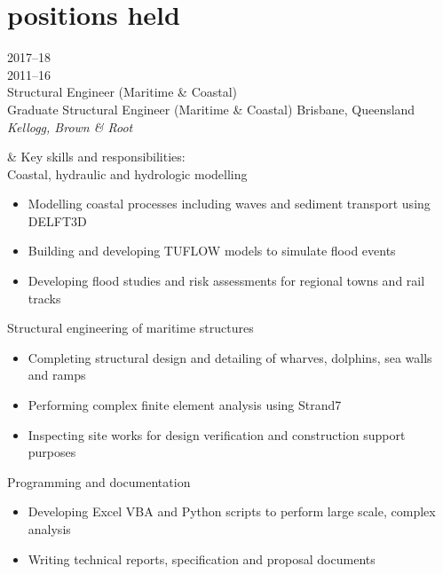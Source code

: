 
\section{positions held}

\begin{entrylist}

\entry%
{2017--18\\
2011--16}
{\vspace*{-4.6ex}\\Structural Engineer (Maritime \& Coastal)\\
Graduate Structural Engineer (Maritime \& Coastal)}%
{Brisbane, Queensland}
{\emph{Kellogg, Brown \& Root}}

& Key skills and responsibilities:\\

\entrybulletsindented%
{}
{Coastal, hydraulic and hydrologic modelling}
{}
{\begin{itemize}
\item Modelling coastal processes including waves and sediment transport using DELFT3D
\item Building and developing TUFLOW models to simulate flood events
\item Developing flood studies and risk assessments for regional towns and rail tracks
\end{itemize}
}

\entrybulletsindented%
{}
{Structural engineering of maritime structures}
{}
{\begin{itemize}
  \item Completing structural design and detailing of wharves, dolphins, sea walls and ramps
  \item Performing complex finite element analysis using Strand7
  \item Inspecting site works for design verification and construction support purposes
\end{itemize}
}

\entrybulletsindented%
{}
{Programming and documentation}
{}
{\begin{itemize}
\item Developing Excel VBA and Python scripts to perform large scale, complex analysis
\item Writing technical reports, specification and proposal documents

\end{itemize}}



\end{entrylist}
